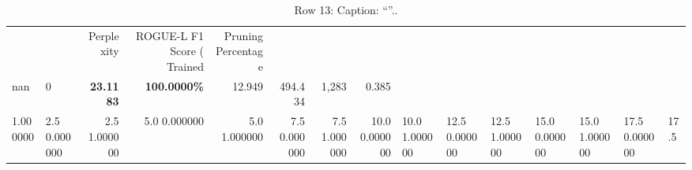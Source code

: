 \begin{table}
\caption{Row 13\ifshowcaption{}: Caption: ``''.\else.\fi}
\label{tab:evaluation-pipeline-13}
\begin{tabular}{llrrrrrr}
 &  & Perplexity & ROGUE-L F1 Score (%
Trained & Pruning Percentage &  &  &  &  &  &  \\
nan & 0 & \bfseries 23.1183 & \bfseries 100.0000\% & 12.949 & 494.434 & 1,283 & 0.385 \\
1.000000 & 2.5%
0.000000 & 2.5%
1.000000 & 5.0%
0.000000 & 5.0%
1.000000 & 7.5%
0.000000 & 7.5%
1.000000 & 10.0%
0.000000 & 10.0%
1.000000 & 12.5%
0.000000 & 12.5%
1.000000 & 15.0%
0.000000 & 15.0%
1.000000 & 17.5%
0.000000 & 17.5%

\end{tabular}
\end{table}
